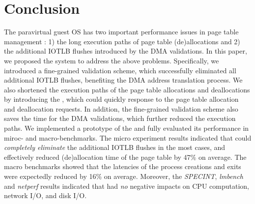 \section{Conclusion} \label{sec:con}
The paravirtual guest OS has two important performance issues in page table management : 1) the long execution paths of page table (de)allocations and 2) the additional IOTLB flushes introduced by the DMA validations. 
In this paper, we proposed the \name system to address the above problems.
Specifically, we introduced a fine-grained validation scheme, which successfully eliminated all additional IOTLB flushes, benefiting the DMA address translation process.
We also shortened the execution paths of the page table allocations and deallocations by introducing the \cache, which could quickly response to the page table allocation and deallocation requests.
In addition, the fine-grained validation scheme also saves the time for the DMA validations, which further reduced the execution paths.
We implemented a prototype of the \name and fully evaluated its performance in miroc- and macro-benchmarks.
The micro experiment results indicated that \name could \emph{completely eliminate} the additional IOTLB flushes in the most cases, and effectively reduced (de)allocation time of the page table by 47\% on average.
The macro benchmarks showed that the latencies of the process creations and exits were expectedly reduced by 16\% on average.
Moreover, the \emph{SPECINT}, \emph{lmbench} and \emph{netperf} results indicated that \name had \emph{no} negative impacts on CPU computation, network I/O, and disk I/O.
